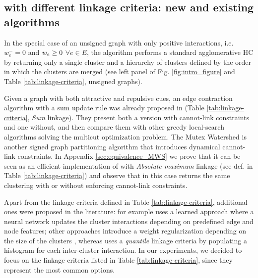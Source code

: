 \subsection{\algname{} with different linkage criteria: new and existing algorithms} \label{sec:alg_update_rules}

In the special case of an unsigned graph with only positive interactions, i.e. $w_e^-=0$ and $w_e \geq 0$ $\forall e\in E$, %
 the algorithm performs a standard agglomerative HC by returning only a single cluster and a hierarchy of clusters defined by the order in which the clusters are merged (see left panel of Fig. \hyperref[fig:intro_figure]{\ref*{fig:intro_figure}} and Table \ref{tab:linkage-criteria}, unsigned graphs).

Given a graph with both attractive and repulsive cues, an edge contraction algorithm with a sum update rule was already proposed in \cite{levinkov2017comparative,keuper2015efficient} (Table \ref{tab:linkage-criteria}, \emph{Sum} linkage). They present both a version with cannot-link constraints and one without, and then compare them with other greedy local-search algorithms solving the multicut optimization problem.
The Mutex Watershed \cite{wolf2018mutex} is another signed graph partitioning algorithm that introduces dynamical cannot-link constraints. In Appendix \ref{sec:equivalence_MWS} we prove that it can be seen as an efficient implementation of \algname{} with \emph{Absolute maximum} linkage (see def. in Table \ref{tab:linkage-criteria}) and observe that in this case \algname{} returns the same clustering with or without enforcing cannot-link constraints.

Apart from the linkage criteria defined in Table \ref{tab:linkage-criteria}, additional ones were proposed in the literature:
\cite{nunez2013machine} for example uses a learned approach where a neural network updates the cluster interactions depending on predefined edge and node features; other approaches introduce a weight regularization depending on the size of the clusters \cite{felzenszwalb2004efficient,kardoostsolving}, whereas 
\cite{funke2018large} uses a \emph{quantile} linkage criteria by populating a histogram for each inter-cluster interaction. In our experiments, we decided to focus on the linkage criteria listed in Table \ref{tab:linkage-criteria}, since they represent the most common options.

